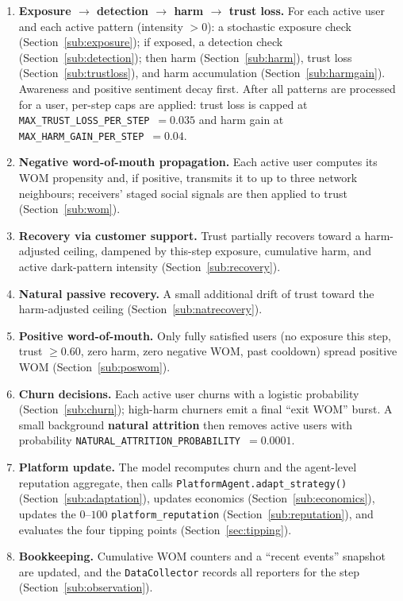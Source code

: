 \documentclass[11pt]{article}
\newcommand{\code}[1]{\texttt{#1}}
\begin{document}
\begin{enumerate}
  \item \textbf{Exposure $\rightarrow$ detection $\rightarrow$ harm $\rightarrow$
  trust loss.} For each active user and each active pattern (intensity $>0$):
  a stochastic exposure check (Section~\ref{sub:exposure}); if exposed, a
  detection check (Section~\ref{sub:detection}); then harm
  (Section~\ref{sub:harm}), trust loss (Section~\ref{sub:trustloss}), and harm
  accumulation (Section~\ref{sub:harmgain}). Awareness and positive sentiment
  decay first. After all patterns are processed for a user, per-step caps are
  applied: trust loss is capped at \code{MAX\_TRUST\_LOSS\_PER\_STEP}~$=0.035$
  and harm gain at \code{MAX\_HARM\_GAIN\_PER\_STEP}~$=0.04$.
  \item \textbf{Negative word-of-mouth propagation.} Each active user computes
  its WOM propensity and, if positive, transmits it to up to three network
  neighbours; receivers' staged social signals are then applied to trust
  (Section~\ref{sub:wom}).
  \item \textbf{Recovery via customer support.} Trust partially recovers toward a
  harm-adjusted ceiling, dampened by this-step exposure, cumulative harm, and
  active dark-pattern intensity (Section~\ref{sub:recovery}).
  \item \textbf{Natural passive recovery.} A small additional drift of trust
  toward the harm-adjusted ceiling (Section~\ref{sub:natrecovery}).
  \item \textbf{Positive word-of-mouth.} Only fully satisfied users
  (no exposure this step, trust $\ge 0.60$, zero harm, zero negative WOM, past
  cooldown) spread positive WOM (Section~\ref{sub:poswom}).
  \item \textbf{Churn decisions.} Each active user churns with a logistic
  probability (Section~\ref{sub:churn}); high-harm churners emit a final
  ``exit WOM'' burst. A small background \textbf{natural attrition} then removes
  active users with probability \code{NATURAL\_ATTRITION\_PROBABILITY}~$=0.0001$.
  \item \textbf{Platform update.} The model recomputes churn and the agent-level
  reputation aggregate, then calls \code{PlatformAgent.adapt\_strategy()}
  (Section~\ref{sub:adaptation}), updates economics
  (Section~\ref{sub:economics}), updates the $0$--$100$
  \code{platform\_reputation} (Section~\ref{sub:reputation}), and evaluates the
  four tipping points (Section~\ref{sec:tipping}).
  \item \textbf{Bookkeeping.} Cumulative WOM counters and a ``recent events''
  snapshot are updated, and the \code{DataCollector} records all reporters for
  the step (Section~\ref{sub:observation}).
\end{enumerate}
\end{document}
